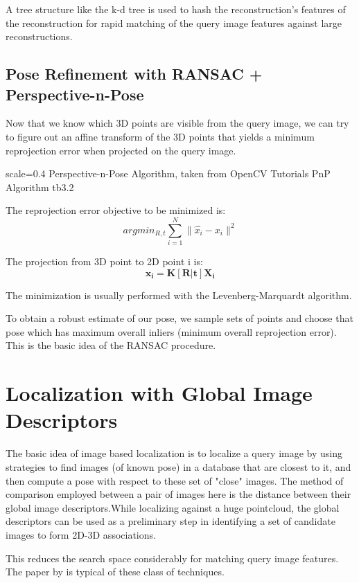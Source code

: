 A tree structure like the k-d tree is used to hash the reconstruction's features of the reconstruction for rapid matching of the query image features against large reconstructions.

\subsection{Pose Refinement with RANSAC + Perspective-n-Pose}
Now that we know which 3D points are visible from the query image, we can try to figure out an affine transform of the 3D points that yields a minimum reprojection error when projected on the query image. 

{scale=0.4}%
{Perspective-n-Pose Algorithm, taken from OpenCV Tutorials}%
{PnP Algorithm}%
{tb3.2} %

The reprojection error objective to be minimized is:
\[argmin_{R, t}\sum_{i=1}^{N}\|\hat{x_i} - x_i\|^2\]

The projection from 3D point to 2D point i is:
\[\mathbf{x_i} = \mathbf{K[R|t]X_i}\]

The minimization is usually performed with the Levenberg-Marquardt algorithm. 

To obtain a robust estimate of our pose, we sample sets of points and choose that pose which has maximum overall inliers (minimum overall reprojection error). This is the basic idea of the RANSAC procedure.

\section{Localization with Global Image Descriptors}
The basic idea of image based localization is to localize a query image by using strategies to find images (of known pose) in a database that are closest to it, and then compute a pose with respect to these set of "close" images. The method of comparison employed between a pair of images here is the distance between their global image descriptors.While localizing against a huge pointcloud, the global descriptors can be used as a preliminary step in identifying a set of candidate images to form 2D-3D associations. 

This reduces the search space considerably for matching query image features. The paper by \cite{Sattler2012} is typical of these class of techniques.


